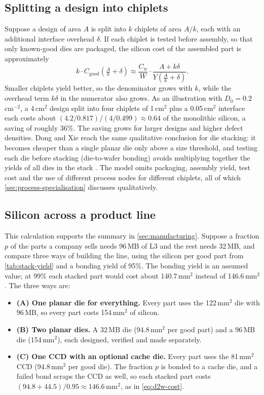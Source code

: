 \subsection{Splitting a design into chiplets}
Suppose a design of area $A$ is split into $k$ chiplets of area $A/k$, each with an additional interface overhead $\delta$. If each chiplet is tested before assembly, so that only known-good dies are packaged, the silicon cost of the assembled part is approximately
\begin{equation*}
  k \cdot C_{\text{good}}\!\left(\tfrac{A}{k} + \delta\right) \approx \frac{C_w}{W}\cdot\frac{A + k\delta}{Y\!\left(\tfrac{A}{k} + \delta\right)}.
\end{equation*}
Smaller chiplets yield better, so the denominator grows with $k$, while the overhead term $k\delta$ in the numerator also grows. As an illustration with $D_0 = 0.2$\,cm$^{-2}$, a 4\,cm$^2$ design split into four chiplets of 1\,cm$^2$ plus a 0.05\,cm$^2$ interface each costs about $(4.2/0.817)/(4/0.499) \approx 0.64$ of the monolithic silicon, a saving of roughly 36\%. The saving grows for larger designs and higher defect densities. Dong and Xie reach the same qualitative conclusion for die stacking: it becomes cheaper than a single planar die only above a size threshold, and testing each die before stacking (die-to-wafer bonding) avoids multiplying together the yields of all dies in the stack \cite{dongSystemlevelCostAnalysis2009}. The model omits packaging, assembly yield, test cost and the use of different process nodes for different chiplets, all of which \cref{sec:process-specialisation} discusses qualitatively.

\subsection{Silicon across a product line}
\label{app:product-line}
This calculation supports the summary in \cref{sec:manufacturing}. Suppose a fraction $p$ of the parts a company sells needs 96\,MB of L3 and the rest needs 32\,MB, and compare three ways of building the line, using the silicon per good part from \cref{tab:stack-yield} and a bonding yield of 95\%. The bonding yield is an assumed value; at 99\% each stacked part would cost about 140.7\,mm$^2$ instead of 146.6\,mm$^2$. The three ways are:
\begin{itemize}
  \item \textbf{(A) One planar die for everything.} Every part uses the 122\,mm$^2$ die with 96\,MB, so every part costs 154\,mm$^2$ of silicon.
  \item \textbf{(B) Two planar dies.} A 32\,MB die (94.8\,mm$^2$ per good part) and a 96\,MB die (154\,mm$^2$), each designed, verified and made separately.
  \item \textbf{(C) One CCD with an optional cache die.} Every part uses the 81\,mm$^2$ CCD (94.8\,mm$^2$ per good die). The fraction $p$ is bonded to a cache die, and a failed bond scraps the CCD as well, so each stacked part costs $(94.8 + 44.5)/0.95 \approx 146.6$\,mm$^2$, as in \cref{eq:d2w-cost}.
\end{itemize}


